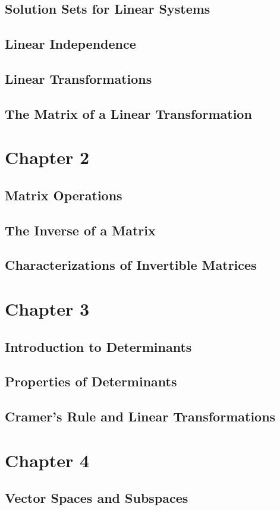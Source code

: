 \documentclass{article}
\begin{document}
\subsection{Solution Sets for Linear Systems}
\subsection{Linear Independence}
\subsection{Linear Transformations}
\subsection{The Matrix of a Linear Transformation}
\section{Chapter 2}
\subsection{Matrix Operations}
\subsection{The Inverse of a Matrix}
\subsection{Characterizations of Invertible Matrices}
\section{Chapter 3}
\subsection{Introduction to Determinants}
\subsection{Properties of Determinants}
\subsection{Cramer's Rule and Linear Transformations}
\section{Chapter 4}
\subsection{Vector Spaces and Subspaces}
\end{document}
